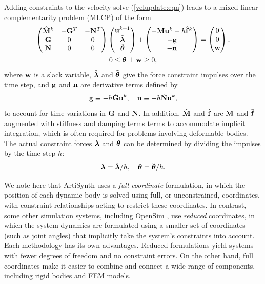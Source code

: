 Adding constraints to the velocity solve (\ref{velupdate:eqn})
leads to a mixed linear complementarity problem (MLCP)
of the form
\begin{gather}
\left(
\begin{matrix}
\hat{{\bf M}}^{k} & -{\bf G}^{T} & -{\bf N}^{T} \\
{\bf G} & 0 & 0 \\
{\bf N} & 0 & 0 
\end{matrix}
\right)
\left(
\begin{matrix}
{\bf u}^{k+1} \\
\tilde{\boldsymbol\lambda} \\
\tilde{\boldsymbol\theta}
\end{matrix}
\right)
+
\left(
\begin{matrix}
-{\bf M} {\bf u}^{k} - h \hat{{\bf f}}^{k} \\
-{\bf g} \\
-{\bf n}
\end{matrix}
\right)
=
\left(
\begin{matrix}
0 \\
0 \\
{\bf w}
\end{matrix}
\right), \notag \\
0 \le \boldsymbol\theta \perp {\bf w} \ge 0,
\label{KKTvelocity:eqn}
\end{gather}
where ${\bf w}$ is a slack variable, $\tilde{\boldsymbol\lambda}$ and $\tilde{\boldsymbol\theta}$ give the force
constraint impulses over the time step, and ${\bf g}$ and ${\bf n}$ are
derivative terms defined by
%
\begin{equation}
{\bf g} \equiv -h \dot{{\bf G}} {\bf u}^k, \quad {\bf n} \equiv -h \dot{{\bf N}} {\bf u}^k,
\end{equation}
%
to account for time variations in ${\bf G}$ and ${\bf N}$.
In addition,
$\hat{{\bf M}}$ and $\hat{{\bf f}}$ are ${\bf M}$ and $\bar{{\bf f}}$ augmented with stiffness
and damping terms terms to accommodate implicit integration, which
is often required for problems involving deformable bodies.
The actual constraint forces $\boldsymbol\lambda$ and $\boldsymbol\theta$ can be determined
by dividing the impulses by the time step $h$:
%
\begin{equation}
\boldsymbol\lambda = \tilde{\boldsymbol\lambda}/h, \quad \boldsymbol\theta = \tilde{\boldsymbol\theta}/h.
\label{impulsesToForces:eqn}
\end{equation}
%

We note here that ArtiSynth uses a {\it full coordinate} formulation,
in which the position of each dynamic body is solved using full, or
unconstrained, coordinates, with constraint relationships acting to
restrict these coordinates. In contrast, some other simulation
systems, including OpenSim \cite{delp2007opensim}, use {\it reduced}
coordinates, in which the system dynamics are formulated using a
smaller set of coordinates (such as joint angles) that implicitly take
the system's constraints into account. Each methodology has its own
advantages. Reduced formulations yield systems with fewer degrees of
freedom and no constraint errors. On the other hand, full coordinates
make it easier to combine and connect a wide range of components,
including rigid bodies and FEM models.


